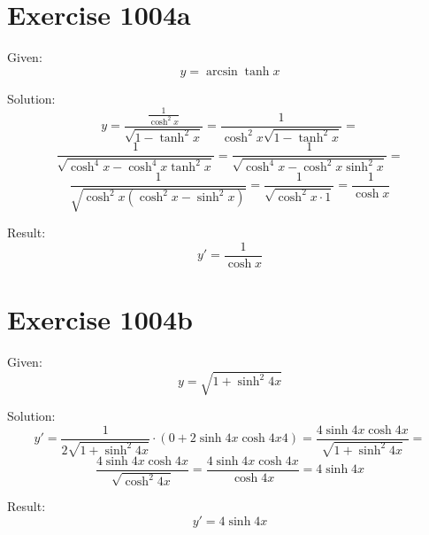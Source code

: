 \documentclass[a4paper, 10pt]{scrartcl}
\begin{document}
\section{Exercise 1004a}

Given:
\[
y = \arcsin{\tanh{x}}
\]

Solution:
\[
y = \frac{\frac{1}{\cosh^{2}{x}}}{\sqrt{1 - \tanh^{2}{x}}} = \frac{1}{\cosh^{2}{x}\sqrt{1 - \tanh^{2}{x}}} =
\]
\[
\frac{1}{\sqrt{\cosh^{4}{x} - \cosh^{4}{x}\tanh^{2}{x}}} = \frac{1}{\sqrt{\cosh^{4}{x} - \cosh^{2}{x}\sinh^{2}{x}}} =
\]
\[
\frac{1}{\sqrt{\cosh^{2}{x}(\cosh^{2}{x} - \sinh^{2}{x})}} = \frac{1}{\sqrt{\cosh^{2}{x}\cdot 1}} = \frac{1}{\cosh{x}}
\]

Result:
\[
y' = \frac{1}{\cosh{x}}
\]

\section{Exercise 1004b}

Given:
\[
y = \sqrt{1 + \sinh^{2}{4x}}
\]

Solution:
\[
y' = \frac{1}{2\sqrt{1 + \sinh^{2}{4x}}}\cdot(0 + 2\sinh{4x}\cosh{4x}4) = \frac{4\sinh{4x}\cosh{4x}}{\sqrt{1 + \sinh^{2}{4x}}} =
\]
\[
\frac{4\sinh{4x}\cosh{4x}}{\sqrt{\cosh^{2}{4x}}} = \frac{4\sinh{4x}\cosh{4x}}{\cosh{4x}} = 4\sinh{4x}
\]

Result:
\[
y' = 4\sinh{4x}
\]
\end{document}
